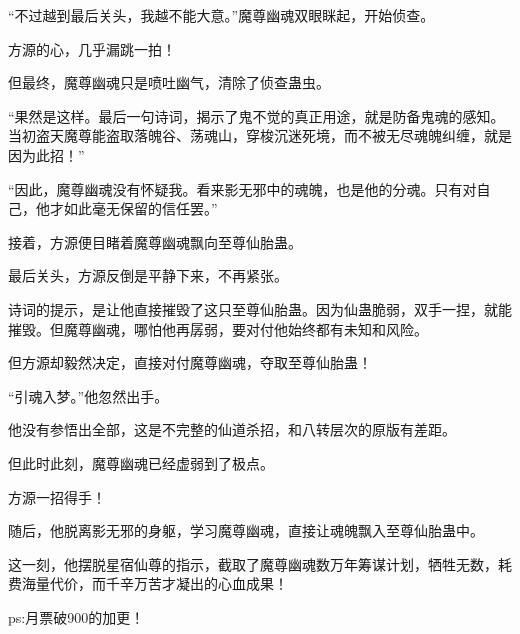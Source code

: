 \begin{this_body}
“不过越到最后关头，我越不能大意。”魔尊幽魂双眼眯起，开始侦查。

方源的心，几乎漏跳一拍！

但最终，魔尊幽魂只是喷吐幽气，清除了侦查蛊虫。

“果然是这样。最后一句诗词，揭示了鬼不觉的真正用途，就是防备鬼魂的感知。当初盗天魔尊能盗取落魄谷、荡魂山，穿梭沉迷死境，而不被无尽魂魄纠缠，就是因为此招！”

“因此，魔尊幽魂没有怀疑我。看来影无邪中的魂魄，也是他的分魂。只有对自己，他才如此毫无保留的信任罢。”

接着，方源便目睹着魔尊幽魂飘向至尊仙胎蛊。

最后关头，方源反倒是平静下来，不再紧张。

诗词的提示，是让他直接摧毁了这只至尊仙胎蛊。因为仙蛊脆弱，双手一捏，就能摧毁。但魔尊幽魂，哪怕他再孱弱，要对付他始终都有未知和风险。

但方源却毅然决定，直接对付魔尊幽魂，夺取至尊仙胎蛊！

“引魂入梦。”他忽然出手。

他没有参悟出全部，这是不完整的仙道杀招，和八转层次的原版有差距。

但此时此刻，魔尊幽魂已经虚弱到了极点。

方源一招得手！

随后，他脱离影无邪的身躯，学习魔尊幽魂，直接让魂魄飘入至尊仙胎蛊中。

这一刻，他摆脱星宿仙尊的指示，截取了魔尊幽魂数万年筹谋计划，牺牲无数，耗费海量代价，而千辛万苦才凝出的心血成果！

ps:月票破900的加更！

\end{this_body}

